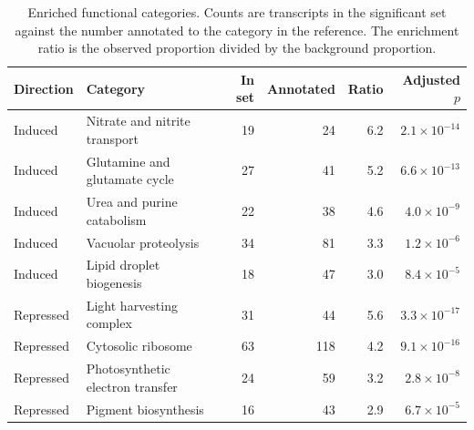 \begin{table}[t]
  \centering
  \small
  \caption{Enriched functional categories. Counts are transcripts in the
  significant set against the number annotated to the category in the
  reference. The enrichment ratio is the observed proportion divided by the
  background proportion.}
  \label{tab:enrichment}
  \begin{tabular}{llrrrr}
    \toprule
    Direction & Category & In set & Annotated & Ratio & Adjusted $p$ \\
    \midrule
    Induced   & Nitrate and nitrite transport   &  19 &  24 & 6.2 & $2.1 \times 10^{-14}$ \\
    Induced   & Glutamine and glutamate cycle   &  27 &  41 & 5.2 & $6.6 \times 10^{-13}$ \\
    Induced   & Urea and purine catabolism      &  22 &  38 & 4.6 & $4.0 \times 10^{-9}$ \\
    Induced   & Vacuolar proteolysis            &  34 &  81 & 3.3 & $1.2 \times 10^{-6}$ \\
    Induced   & Lipid droplet biogenesis        &  18 &  47 & 3.0 & $8.4 \times 10^{-5}$ \\
    Repressed & Light harvesting complex        &  31 &  44 & 5.6 & $3.3 \times 10^{-17}$ \\
    Repressed & Cytosolic ribosome              &  63 & 118 & 4.2 & $9.1 \times 10^{-16}$ \\
    Repressed & Photosynthetic electron transfer&  24 &  59 & 3.2 & $2.8 \times 10^{-8}$ \\
    Repressed & Pigment biosynthesis            &  16 &  43 & 2.9 & $6.7 \times 10^{-5}$ \\
    \bottomrule
  \end{tabular}
\end{table}
